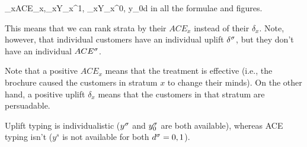 \beq
\delta_x\rarrow ACE_x,\quad \av{\rvy}_x\rarrow Y_x^1,\quad
{}_x\rarrow Y_x^0, \quad y_0\rarrow d
\eeq
in all the formulae and figures.

This means that we can rank strata by their $ACE_x$ instead of
their $\delta_x$. Note, however, that individual customers
have an individual uplift $\delta^\sigma$, but they don't have an
individual $ACE^\sigma$. 

Note that a positive $ACE_x$ means that 
the treatment is effective (i.e., the brochure caused the 
customers in stratum $x$ to change their minds). On the other hand,
a positive uplift $\delta_x$ means that the customers
in that stratum are persuadable.

Uplift typing is individualistic ($y^\sigma$ and
$y^\sigma_0$ are both available), whereas ACE typing isn't
($y^s$ is not available for both $d^\sigma=0,1$).


